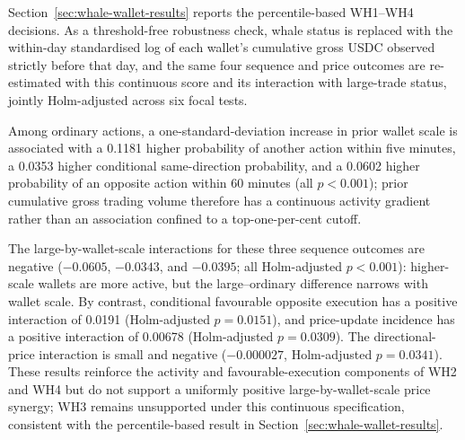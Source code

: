 Section~\ref{sec:whale-wallet-results} reports the percentile-based WH1--WH4 decisions. As a threshold-free robustness check, whale status is replaced with the within-day standardised log of each wallet's cumulative gross USDC observed strictly before that day, and the same four sequence and price outcomes are re-estimated with this continuous score and its interaction with large-trade status, jointly Holm-adjusted across six focal tests.

Among ordinary actions, a one-standard-deviation increase in prior wallet scale is associated with a 0.1181 higher probability of another action within five minutes, a 0.0353 higher conditional same-direction probability, and a 0.0602 higher probability of an opposite action within 60 minutes (all $p<0.001$); prior cumulative gross trading volume therefore has a continuous activity gradient rather than an association confined to a top-one-per-cent cutoff.

The large-by-wallet-scale interactions for these three sequence outcomes are negative ($-0.0605$, $-0.0343$, and $-0.0395$; all Holm-adjusted $p<0.001$): higher-scale wallets are more active, but the large--ordinary difference narrows with wallet scale. By contrast, conditional favourable opposite execution has a positive interaction of 0.0191 (Holm-adjusted $p=0.0151$), and price-update incidence has a positive interaction of 0.00678 (Holm-adjusted $p=0.0309$). The directional-price interaction is small and negative ($-0.000027$, Holm-adjusted $p=0.0341$). These results reinforce the activity and favourable-execution components of WH2 and WH4 but do not support a uniformly positive large-by-wallet-scale price synergy; WH3 remains unsupported under this continuous specification, consistent with the percentile-based result in Section~\ref{sec:whale-wallet-results}.

